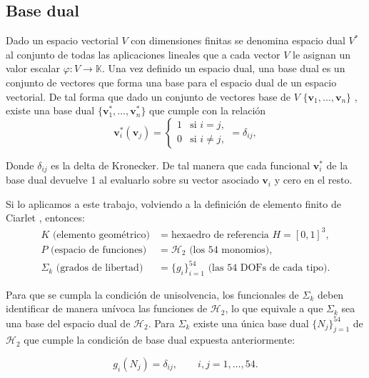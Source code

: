 \documentclass[12pt]{report} %
\begin{document}
\subsection{Base dual}\label{subsec:base-dual}
Dado un espacio vectorial $V$ con dimensiones finitas se denomina espacio dual $V^*$ al  conjunto de todas las aplicaciones lineales que a cada vector $V$ le asignan un valor escalar $\varphi: V \to \mathbb{K}$. Una vez definido un espacio dual, una base dual es un conjunto de vectores que forma una base para el espacio dual de un espacio vectorial. De tal forma que dado un conjunto de vectores base de $V$ $\{\mathbf{v}_1, \dots, \mathbf{v}_n\}$ , existe una base dual $\{\mathbf{v}^*_1, \dots, \mathbf{v}^*_n\}$ que cumple con la relación
\begin{equation}\label{eq:dualidad-general}
	\mathbf{v}^*_i(\mathbf{v}_j) =
	\begin{cases}
		1 & \text{si } i = j,\\
		0 & \text{si } i \neq j,
	\end{cases}
	= \delta_{ij},
\end{equation}

Donde $\delta_{ij}$ es la delta de Kronecker. De tal manera que cada funcional $\mathbf{v}^*_i$ de la base dual devuelve 1 al evaluarlo sobre su vector asociado $\mathbf{v}_i$ y cero en el resto.

Si lo aplicamos a este trabajo, volviendo a la definición de elemento finito de Ciarlet \cite{ciarlet2002}, entonces:
\begin{align}
	K \text{ (elemento geométrico)} &= \text{hexaedro de referencia } H = [0,1]^3, \\
	P \text{ (espacio de funciones)} &= \mathcal{H}_2 \text{ (los 54 monomios)}, \\
	\Sigma_k \text{ (grados de libertad)} &= \{g_i\}_{i=1}^{54} \text{ (las 54 DOFs de cada tipo)} .
\end{align}

Para que se cumpla la condición de unisolvencia, los funcionales de $\Sigma_k$ deben  identificar de manera unívoca las funciones de $\mathcal{H}_2$, lo que equivale a que $\Sigma_k$ sea una base del espacio dual de $\mathcal{H}_2$. Para $\Sigma_k$ existe una única base dual  $\{N_j\}_{j=1}^{54}$ de $\mathcal{H}_2$ que cumple la condición de base dual expuesta anteriormente:

\begin{equation}\label{eq:dual}
 g_i(N_j) = \delta_{ij}, \qquad i,j = 1,\dots,54 .
\end{equation}
\end{document}
